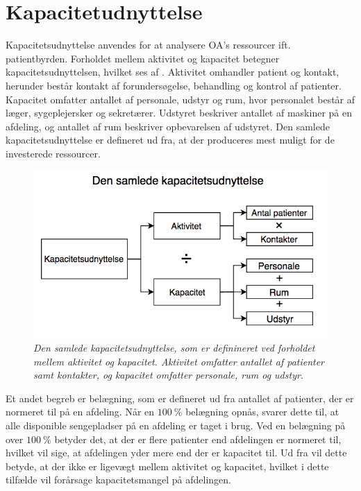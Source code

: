 \section{Kapacitetudnyttelse} \label{kap}
Kapacitetsudnyttelse anvendes for at analysere OA's ressourcer ift. patientbyrden. Forholdet mellem aktivitet og kapacitet betegner kapacitetsudnyttelsen, hvilket ses af . Aktivitet omhandler patient og kontakt, herunder består kontakt af forundersøgelse, behandling og kontrol af patienter. Kapacitet omfatter antallet af personale, udstyr og rum, hvor personalet består af læger, sygeplejersker og sekretærer. Udstyret beskriver antallet af maskiner på en afdeling, og antallet af rum beskriver opbevarelsen af udstyret. Den samlede kapacitetsudnyttelse er defineret ud fra, at der produceres mest muligt for de investerede ressourcer.\cite{Company2013} 

\begin{figure}[H]
	\flushleft 
	\centering
	\includegraphics[scale=.5]{figures/Kapacitetsudnyttelse.png}
	\flushleft
	\caption{\textit{Den samlede kapacitetsudnyttelse, som er definineret ved forholdet mellem aktivitet og kapacitet. Aktivitet omfatter antallet af patienter samt kontakter, og kapacitet omfatter personale, rum og udstyr.}\cite{Company2013}}
	\label{kapacitet}
\end{figure}

\noindent
Et andet begreb er belægning, som er defineret ud fra antallet af patienter, der er normeret til på en afdeling\cite{Heidmann2014}. Når en $100~\%$ belægning opnås, svarer dette til, at alle disponible sengepladser på en afdeling er taget i brug. Ved en belægning på over $100~\%$ betyder det, at der er flere patienter end afdelingen er normeret til, hvilket vil sige, at afdelingen yder mere end der er kapacitet til. Ud fra  vil dette betyde, at der ikke er ligevægt mellem aktivitet og kapacitet, hvilket i dette tilfælde vil forårsage kapacitetsmangel på afdelingen. 


